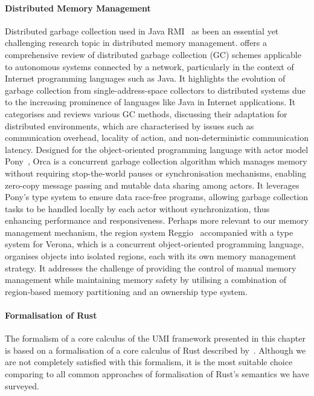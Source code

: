 \paragraph*{Distributed Memory Management}
Distributed garbage collection used in Java RMI~\citep{10.5555/1268049.1268066} as been an essential yet challenging research topic in distributed memory management. \citet{10.1145/292469.292471} offers a comprehensive review of distributed garbage collection (GC) schemes applicable to autonomous systems connected by a network, particularly in the context of Internet programming languages such as Java. It highlights the evolution of garbage collection from single-address-space collectors to distributed systems due to the increasing prominence of languages like Java in Internet applications. It categorises and reviews various GC methods, discussing their adaptation for distributed environments, which are characterised by issues such as communication overhead, locality of action, and non-deterministic communication latency. Designed for the object-oriented programming language with actor model Pony~\citep{10.1145/3133896}, Orca is a concurrent garbage collection algorithm which manages memory without requiring stop-the-world pauses or synchronisation mechanisms, enabling zero-copy message passing and mutable data sharing among actors. It leverages Pony's type system to ensure data race-free programs, allowing garbage collection tasks to be handled locally by each actor without synchronization, thus enhancing performance and responsiveness.
Perhaps more relevant to our memory management mechanism, the region system Reggio~\citep{10.1145/3622846} accompanied with a type system for Verona, which is a concurrent object-oriented programming language, organises objects into isolated regions, each with its own memory management strategy. It addresses the challenge of providing the control of manual memory management while maintaining memory safety by utilising a combination of region-based memory partitioning and an ownership type system.

\paragraph*{Formalisation of Rust}
The formalism of a core calculus of the UMI framework presented in this chapter is based on a formalisation of a core calculus of Rust described by~\citet{10.1145/3443420}. Although we are not completely satisfied with this formalism, it is the most suitable choice comparing to all common approaches of formalisation of Rust's semantics we have surveyed.


